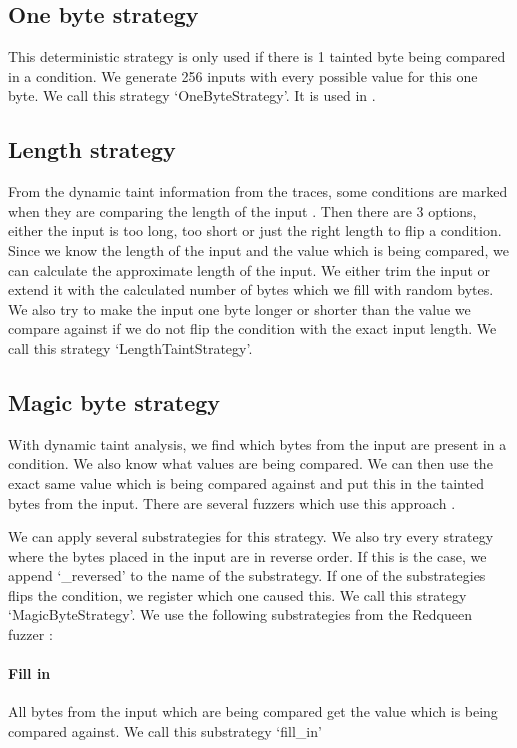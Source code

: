 \subsection{One byte strategy}
This deterministic strategy is only used if there is 1 tainted byte being compared in a condition. We generate 256 inputs with every possible value for this one byte. We call this strategy `OneByteStrategy'. It is used in \cite{chen2018angora}.

\subsection{Length strategy}
From the dynamic taint information from the traces, some conditions are marked when they are comparing the length of the input \cite{chen2018angora}. Then there are 3 options, either the input is too long, too short or just the right length to flip a condition. Since we know the length of the input and the value which is being compared, we can calculate the approximate length of the input. We either trim the input or extend it with the calculated number of bytes which we fill with random bytes. We also try to make the input one byte longer or shorter than the value we compare against if we do not flip the condition with the exact input length.
We call this strategy `LengthTaintStrategy'.

\subsection{Magic byte strategy}
With dynamic taint analysis, we find which bytes from the input are present in a condition. We also know what values are being compared. We can then use the exact same value which is being compared against and put this in the tainted bytes from the input.
There are several fuzzers which use this approach \cite{rawat2017vuzzer, aschermann2019redqueen}.

We can apply several substrategies for this strategy. We also try every strategy where the bytes placed in the input are in reverse order. If this is the case, we append `\_reversed' to the name of the substrategy. If one of the substrategies flips the condition, we register which one caused this. We call this strategy `MagicByteStrategy'.
We use the following substrategies from the Redqueen fuzzer \cite{aschermann2019redqueen}:
\paragraph{Fill in}
All bytes from the input which are being compared get the value which is being compared against.
We call this substrategy `fill\_in'
